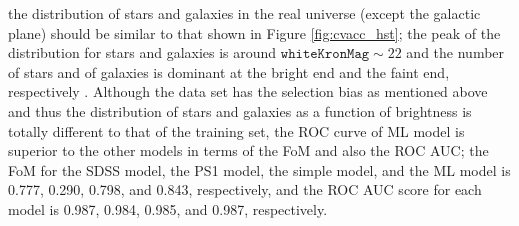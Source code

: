 \documentclass[twocolumn]{aastex62}
\begin{document}
{the distribution of stars and galaxies in the real universe (except the galactic plane) 
should be similar to that shown in Figure \ref{fig:cvacc_hst}; 
the peak of the distribution for stars and galaxies is around $\mathtt{whiteKronMag} \sim 22$ 
and the number of stars and of galaxies is dominant at the bright end and the faint end, 
respectively \citep{Chambers16}. 
Although the data set has the selection bias as mentioned above 
and thus the distribution of stars and galaxies as a function of brightness is totally different to that of the training set, 
the ROC curve of ML model is superior to the other models in terms of the FoM and also the ROC AUC; 
the FoM for the SDSS model, the PS1 model, the simple model, and the ML model is 
0.777, 0.290, 0.798, and 0.843, respectively, 
and the ROC AUC score for each model is 
0.987, 0.984, 0.985, and 0.987, respectively. 

}
\end{document}
